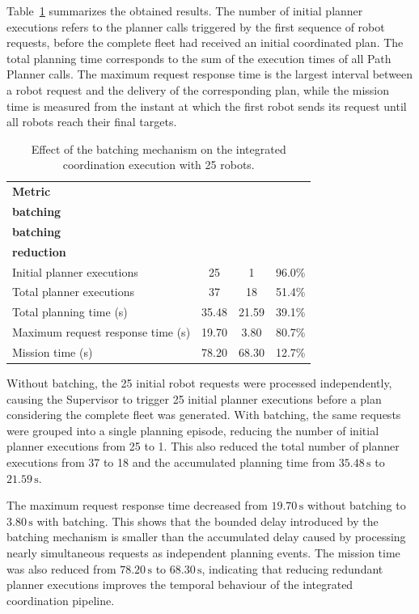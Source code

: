 Table~\ref{tab:batching_results} summarizes the obtained results. The number of initial planner
executions refers to the planner calls triggered by the first sequence of robot requests, before the
complete fleet had received an initial coordinated plan. The total planning time corresponds to the
sum of the execution times of all Path Planner calls. The maximum request response time is the
largest interval between a robot request and the delivery of the corresponding plan, while the
mission time is measured from the instant at which the first robot sends its request until all robots
reach their final targets.

\begin{table}[H]
\centering
\caption{Effect of the batching mechanism on the integrated coordination execution with 25 robots.}
\label{tab:batching_results}
\scriptsize
\setlength{\tabcolsep}{4pt}
\begin{tabular}{@{}lccc@{}}
\toprule
\textbf{Metric} &
\makecell{\textbf{Without}\\\textbf{batching}} &
\makecell{\textbf{With}\\\textbf{batching}} &
\makecell{\textbf{Relative}\\\textbf{reduction}} \\
\midrule
Initial planner executions        & 25    & 1     & 96.0\% \\
Total planner executions          & 37    & 18    & 51.4\% \\
Total planning time (s)           & 35.48 & 21.59 & 39.1\% \\
Maximum request response time (s) & 19.70 & 3.80  & 80.7\% \\
Mission time (s)                  & 78.20 & 68.30 & 12.7\% \\
\bottomrule
\end{tabular}
\end{table}

Without batching, the 25 initial robot requests were processed independently, causing the
Supervisor to trigger 25 initial planner executions before a plan considering the complete fleet was
generated. With batching, the same requests were grouped into a single planning episode, reducing
the number of initial planner executions from 25 to 1. This also reduced the total number of planner
executions from 37 to 18 and the accumulated planning time from \(35.48\,\mathrm{s}\) to
\(21.59\,\mathrm{s}\).

The maximum request response time decreased from \(19.70\,\mathrm{s}\) without batching to
\(3.80\,\mathrm{s}\) with batching. This shows that the bounded delay introduced by the batching
mechanism is smaller than the accumulated delay caused by processing nearly simultaneous
requests as independent planning events. The mission time was also reduced from
\(78.20\,\mathrm{s}\) to \(68.30\,\mathrm{s}\), indicating that reducing redundant planner executions
improves the temporal behaviour of the integrated coordination pipeline.

